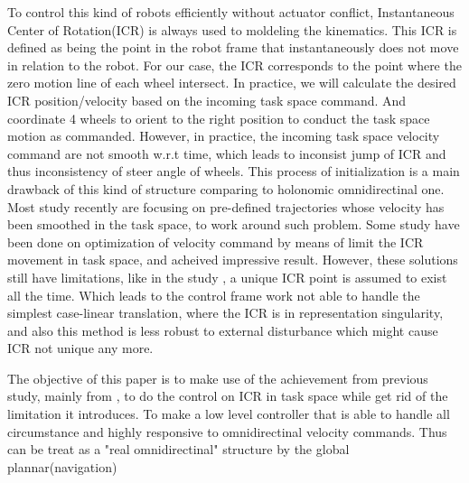 To control this kind of robots efficiently without actuator conflict, Instantaneous Center of 
Rotation(ICR) is always used to moldeling the kinematics. This ICR is defined as being the point in the robot frame that instantaneously does not move in relation to the robot. For our case, the ICR 
corresponds to the point where the zero motion line of each wheel intersect. In practice, we will calculate the desired ICR position/velocity based on the incoming task space command. And coordinate 4 wheels to 
orient to the right position to conduct the task space motion as commanded. However, in practice, the incoming task space velocity command are not smooth w.r.t time, which leads to inconsist jump of ICR and thus
inconsistency of steer angle of wheels. This process of initialization is a main drawback of this kind of structure comparing to holonomic omnidirectinal one. Most study recently are focusing on pre-defined 
trajectories whose velocity has been smoothed in the task space\cite{dietrich2011singularity}\cite{sorour2016kinematic}, to work around such problem. Some study have been done on optimization of velocity command
by means of limit the ICR movement in task space\cite{sorour2016motion}\cite{sorour2019complementary}, and acheived impressive result. However, these solutions still have limitations, like in the study 
\cite{sorour2016motion}, a unique ICR point is assumed to exist all the time. Which leads to the control frame work not able to handle the simplest case-linear translation, where the ICR is in representation 
singularity, and also this method is less robust to external disturbance which might cause ICR not unique any more.

The objective of this paper is to make use of the achievement from previous study, mainly from \cite{sorour2016motion}, to do the control on ICR in task space while get rid of the limitation it introduces. To
make a low level controller that is able to handle all circumstance and highly responsive to omnidirectinal velocity commands. Thus can be treat as a "real omnidirectinal" structure by the global plannar(navigation)

